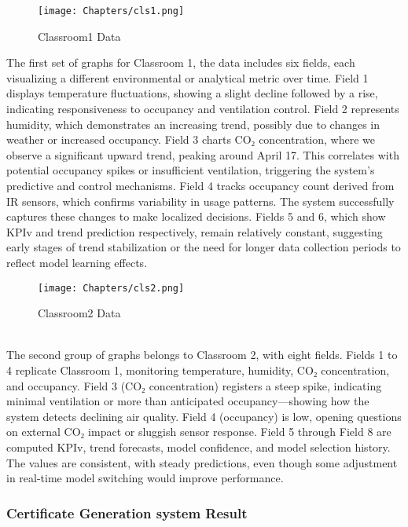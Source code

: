 \begin{figure}[h!]
		\centering
	\texttt{[image: Chapters/cls1.png]}
		\caption{Classroom1 Data}
\end{figure}
The first set of graphs for Classroom 1, the data includes six fields, each visualizing a different environmental or analytical metric over time. Field 1 displays temperature fluctuations, showing a slight decline followed by a rise, indicating responsiveness to occupancy and ventilation control. Field 2 represents humidity, which demonstrates an increasing trend, possibly due to changes in weather or increased occupancy. Field 3 charts CO₂ concentration, where we observe a significant upward trend, peaking around April 17. This correlates with potential occupancy spikes or insufficient ventilation, triggering the system’s predictive and control mechanisms. Field 4 tracks occupancy count derived from IR sensors, which confirms variability in usage patterns. The system successfully captures these changes to make localized decisions. Fields 5 and 6, which show KPIv and trend prediction respectively, remain relatively constant, suggesting early stages of trend stabilization or the need for longer data collection periods to reflect model learning effects.
\begin{figure}[h!]
		\centering
	\texttt{[image: Chapters/cls2.png]}
		\caption{Classroom2 Data}
\end{figure}
\\
The second group of graphs belongs to Classroom 2, with eight fields. Fields 1 to 4 replicate Classroom 1, monitoring temperature, humidity, CO₂ concentration, and occupancy. Field 3 (CO₂ concentration) registers a steep spike, indicating minimal ventilation or more than anticipated occupancy—showing how the system detects declining air quality. Field 4 (occupancy) is low, opening questions on external CO₂ impact or sluggish sensor response. Field 5 through Field 8 are computed KPIv, trend forecasts, model confidence, and model selection history. The values are consistent, with steady predictions, even though some adjustment in real-time model switching would improve performance.



\subsubsection{Certificate Generation system Result}

